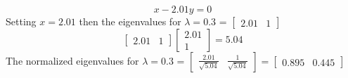 \documentclass[12pt,a4paper]{paper}
\begin{document}
\begin{enumerate}
\begin{enumerate}
\begin{equation}
x - 2.01 y = 0
\end{equation}
Setting $x = 2.01$ then the eigenvalues for $\lambda = 0.3$ = $\left[\begin{array}{cc}2.01 &  1\end{array}\right]$
\begin{equation}
\left[\begin{array}{cc}2.01 &  1\end{array}\right]\left[\begin{array}{c}2.01 \\  1\end{array}\right] = 5.04
\end{equation}
The normalized eigenvalues for $\lambda = 0.3$ = $\left[\begin{array}{cc}\frac{2.01}{\sqrt{5.04}} &  \frac{1}{\sqrt{5.04}}\end{array}\right] = \left[\begin{array}{cc}0.895 & 0.445\end{array}\right]$


\end{enumerate}
\end{enumerate}
\end{document}
